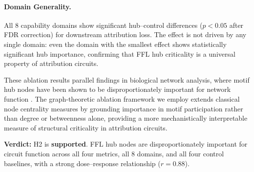 \paragraph{Domain Generality.}
All 8 capability domains show significant hub--control differences ($p<0.05$ after FDR correction) for downstream attribution loss. The effect is not driven by any single domain: even the domain with the smallest effect shows statistically significant hub importance, confirming that FFL hub criticality is a universal property of attribution circuits.

These ablation results parallel findings in biological network analysis, where motif hub nodes have been shown to be disproportionately important for network function \cite{alon2007network}. The graph-theoretic ablation framework we employ extends classical node centrality measures \cite{freeman1978centrality} by grounding importance in motif participation rather than degree or betweenness alone, providing a more mechanistically interpretable measure of structural criticality in attribution circuits.

\textbf{Verdict:} H2 is \textbf{supported}. FFL hub nodes are disproportionately important for circuit function across all four metrics, all 8 domains, and all four control baselines, with a strong dose--response relationship ($r=0.88$).